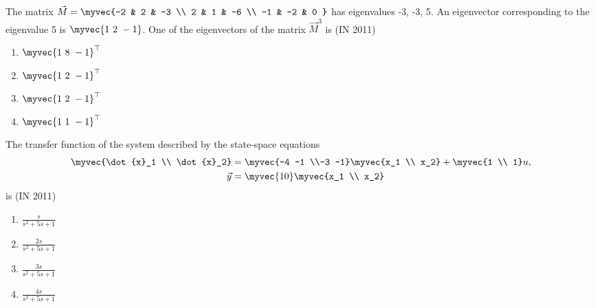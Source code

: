 \item The matrix $ \Vec{M} = \myvec{-2 & 2 & -3 \\ 2 & 1 & -6 \\ -1 & -2 & 0 } $ has eigenvalues -3, -3, 5. An eigenvector corresponding to the eigenvalue 5 is $\myvec{1\ 2\ -1}$. One of the eigenvectors of the matrix $ \vec{M}^3 $ is
\hfill(IN 2011)
\begin{multicols}{4}
\begin{enumerate}
\item $\myvec{1\ 8\ -1}^{\top}$
\item $\myvec{1\ 2\ -1}^{\top}$
\item $\myvec{1\ 2\ -1}^{\top}$
\item $\myvec{1\ 1\ -1}^{\top}$
\end{enumerate}
\end{multicols} 

\item The transfer function of the system described by the state-space equations 
	\begin{align*}\myvec{\dot{x}_1 \\ \dot{x}_2}&=\myvec{-4 -1 \\-3 -1}\myvec{x_1 \\ x_2} +\myvec{1 \\ 1}u,
	\\
	\Vec{y}&=\myvec{1 0}\myvec{x_1 \\ x_2}
\end{align*}
is \hfill(IN 2011)
\begin{multicols}{4}
\begin{enumerate}
\item $\frac{s}{s^2 + 5s + 1}$
\item $\frac{2s}{s^2 + 5s + 1}$
\item $\frac{3s}{s^2 + 5s + 1}$
\item $\frac{4s}{s^2 + 5s + 1}$
\end{enumerate}
\end{multicols} 
